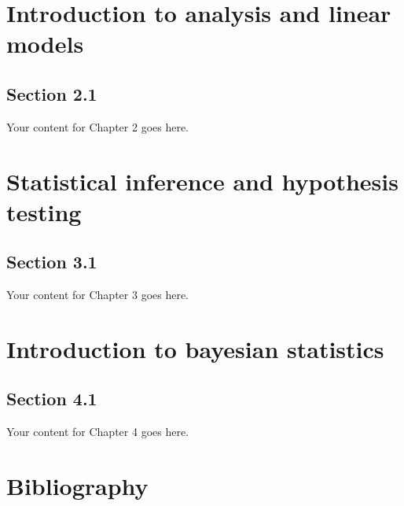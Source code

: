\documentclass{book}
\begin{document}
\chapter{Introduction to analysis and linear models}
\section{Section 2.1}
Your content for Chapter 2 goes here.

\chapter{Statistical inference and hypothesis testing}
\section{Section 3.1}
Your content for Chapter 3 goes here.

\chapter{Introduction to bayesian statistics}
\section{Section 4.1}
Your content for Chapter 4 goes here.

\backmatter

\chapter*{Bibliography}
\end{document}
